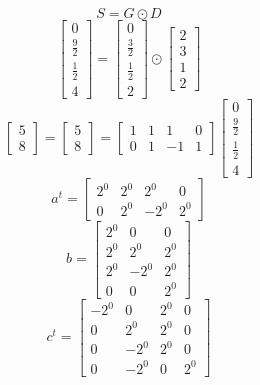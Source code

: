 \documentclass{article}%
\begin{document}
\[%
S = G \odot D%
\]%
\[%
\left[\begin{matrix}0\\\frac{9}{2}\\\frac{1}{2}\\4\end{matrix}\right] = \left[\begin{matrix}0\\\frac{3}{2}\\\frac{1}{2}\\2\end{matrix}\right] \odot \left[\begin{matrix}2\\3\\1\\2\end{matrix}\right]%
\]%
\[%
\left[\begin{matrix}5\\8\end{matrix}\right] = \left[\begin{matrix}5\\8\end{matrix}\right] = \left[\begin{matrix}1 & 1 & 1 & 0\\0 & 1 & -1 & 1\end{matrix}\right] \left[\begin{matrix}0\\\frac{9}{2}\\\frac{1}{2}\\4\end{matrix}\right]%
\]%
\[%
a^{t} = \left[\begin{matrix}2^{0} & 2^{0} & 2^{0} & 0\\0 & 2^{0} & - 2^{0} & 2^{0}\end{matrix}\right]%
\]%
\[%
b = \left[\begin{matrix}2^{0} & 0 & 0\\2^{0} & 2^{0} & 2^{0}\\2^{0} & - 2^{0} & 2^{0}\\0 & 0 & 2^{0}\end{matrix}\right]%
\]%
\[%
c^{t} = \left[\begin{matrix}- 2^{0} & 0 & 2^{0} & 0\\0 & 2^{0} & 2^{0} & 0\\0 & - 2^{0} & 2^{0} & 0\\0 & - 2^{0} & 0 & 2^{0}\end{matrix}\right]%
\]%
\end{document}
